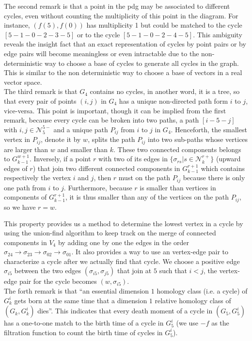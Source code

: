 \documentclass[a4paper,12pt]{article}
\numberwithin{equation}{section}
\begin{document}
	The second remark is that a point in the pdg may be associated to different cycles, even without counting the multiplicity of this point in the diagram. For instance, $(f(5),f(0))$ has multiplicity 1 but could be matched to the cycle $[5-1-0-2-3-5]$ or to the cycle $[5-1-0-2-4-5]$. This ambiguity reveals the insight fact that an exact representation of cycles by point pairs or by edge pairs will become meaningless or even intractable due to the non-deterministic way to choose a base of cycles to generate all cycles in the graph. This is similar to the non deterministic way to choose a base of vectors in a real vector space.\\
	
	The third remark is that $G_4$ contains no cycles, in another word, it is a tree, so that every pair of points $(i,j)$ in $G_4$ has a unique non-directed path form $i$ to $j$, vice-versa.
	This point is important, though it can be implied from the first remark, because every cycle can be broken into two paths, a path $[i-5-j]$ with $i,j \in \mathcal{N}^{5-}_5$ and a unique path $P_{ij}$ from $i$ to $j$ in $G_4$. Henceforth, the smallest vertex in $P_{ij}$, denote it by $w$, splits the path $P_{ij}$ into two sub-paths whose vertices are larger than $w$ and smaller than $k$. These two connected components belongs to $G_{k-1}^{w+1}$. Inversely, if a point $r$ with two of its edges in $\{ \sigma_{rs} \vert s \in \mathcal{N}^{r+}_k \}$ (upward edges of $r$) that join two different connected components in $G_{k-1}^{r+1}$ which contains respectively the vertex $i$ and $j$, then $r$ must on the path $P_{ij}$ because there is only one path from $i$ to $j$. Furthermore, because $r$ is smaller than vertices in components of $G_{k-1}^{r+1}$, it is thus smaller than any of the vertices on the path $P_{ij}$, so we have $r = w$.
	
	This property provides us a method to determine the lowest vertex in a cycle by using the union-find algorithm to keep track on the merge of connected components in $V_4$ by adding one by one the edges in the order
	$ \sigma_{24} \to \sigma_{23} \to \sigma_{02} \to \sigma_{01}. $	
	It also provides a way to use an vertex-edge pair to characterize a cycle after we actually find that cycle. We choose a positive edge $\sigma_{i5}$ between the two edges $(\sigma_{i5}, \sigma_{j5})$ that join at $5$ such that $i < j$, the vertex-edge pair for the cycle becomes $(w, \sigma_{i5})$. \\	
	
	The forth remark is that ``an essential dimension $1$ homology class (i.e. a cycle) of $G^{i}_k$ gets born at the same time that a dimension $1$ relative homology class of $(G_k, G_k^i)$ dies''.
	This indicates that every death moment of a cycle in $(G_5, G_5^i)$ has a one-to-one match to the birth time of a cycle in $G^i_5$ (we use $-f$ as the filtration function to count the birth time of cycles in $G_5^i$). 
	
\end{document}
